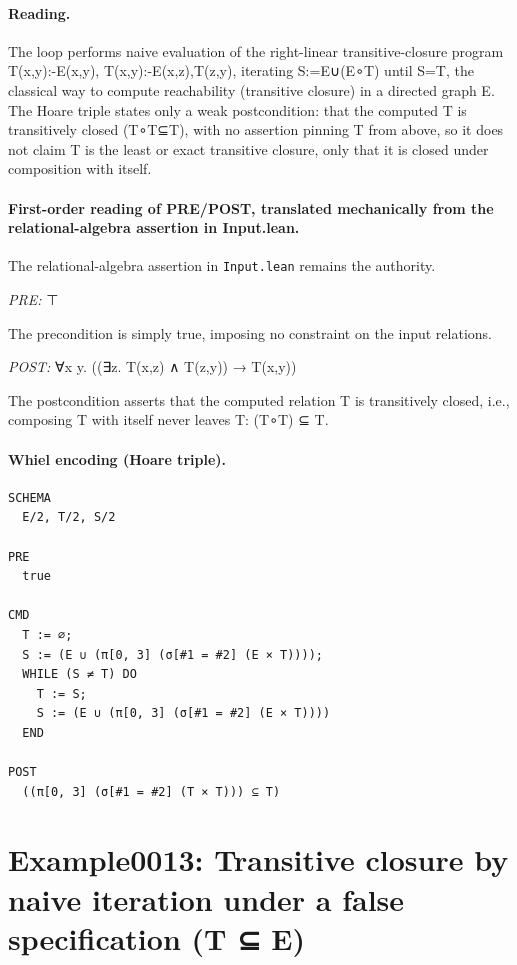 \documentclass[10pt]{article}
\begin{document}
\paragraph{Reading.} The loop performs naive evaluation of the right-linear transitive-closure program T(x,y):-E(x,y), T(x,y):-E(x,z),T(z,y), iterating S:=E∪(E∘T) until S=T, the classical way to compute reachability (transitive closure) in a directed graph E. The Hoare triple states only a weak postcondition: that the computed T is transitively closed (T∘T⊆T), with no assertion pinning T from above, so it does not claim T is the least or exact transitive closure, only that it is closed under composition with itself.

\paragraph{First-order reading of PRE/POST, translated mechanically from the relational-algebra assertion in Input.lean.} The relational-algebra assertion in \texttt{Input.lean} remains the authority.

\textit{PRE:} ⊤\par The precondition is simply true, imposing no constraint on the input relations.

\textit{POST:} ∀x y. ((∃z. T(x,z) ∧ T(z,y)) → T(x,y))\par The postcondition asserts that the computed relation T is transitively closed, i.e., composing T with itself never leaves T: (T∘T) ⊆ T.

\paragraph{Whiel encoding (Hoare triple).}

\begin{Verbatim}[fontsize=\scriptsize,breaklines=true,breakanywhere=true,frame=single,framesep=1.5mm]
SCHEMA
  E/2, T/2, S/2

PRE
  true 

CMD
  T := ∅;
  S := (E ∪ (π[0, 3] (σ[#1 = #2] (E × T))));
  WHILE (S ≠ T) DO
    T := S;
    S := (E ∪ (π[0, 3] (σ[#1 = #2] (E × T))))
  END

POST
  ((π[0, 3] (σ[#1 = #2] (T × T))) ⊆ T)
\end{Verbatim}

\Needspace{0.45\textheight}

\section{Example0013: Transitive closure by naive iteration under a false specification (T ⊆ E)}\label{case:Example0013}
\end{document}
